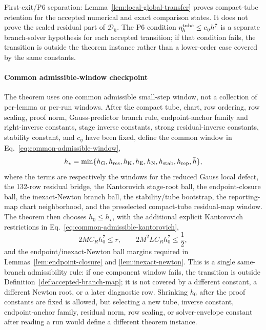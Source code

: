\documentclass[preprint,12pt]{elsarticle}
\begin{document}
First-exit/P6 separation: Lemma~\ref{lem:local-global-transfer} proves
compact-tube retention for the accepted numerical and exact comparison states.
It does not prove the scaled residual part of \(\mathcal D_h\).  The P6
condition \(\eta_h^{\rm tube}\le c_\eta h^7\) is a separate branch-solver
hypothesis for each accepted transition; if that condition fails, the
transition is outside the theorem instance rather than a lower-order case
covered by the same constants.

\paragraph{Common admissible-window checkpoint}
The theorem uses one common admissible small-step window, not a collection of
per-lemma or per-run windows.  After the compact tube, chart, row ordering,
row scaling, proof norm, Gauss-predictor branch rule, endpoint-anchor family and
right-inverse constants, stage inverse constants, strong residual-inverse
constants, stability constant, and \(c_\eta\) have been fixed, define the
common window in Eq.~\eqref{eq:common-admissible-window},
\begin{equation}
\label{eq:common-admissible-window}
  h_\star=
  \min\{h_{\rm G},h_{\rm res},h_{\rm K},h_{\rm E},h_{\rm N},
  h_{\rm stab},h_{\rm rep},\bar h\},
\end{equation}
where the terms are respectively the windows for the reduced Gauss local
defect, the 132-row residual bridge, the Kantorovich stage-root ball, the
endpoint-closure ball, the inexact-Newton branch ball, the stability/tube
bootstrap, the reporting-map chart neighborhood, and the preselected
compact-tube residual-map window.  The theorem then chooses
\(h_0\le h_\star\), with the additional explicit Kantorovich restrictions
in Eq.~\eqref{eq:common-admissible-kantorovich},
\begin{equation}
\label{eq:common-admissible-kantorovich}
  2MC_Rh_0^7\le r,\qquad
  2M^2LC_Rh_0^7\le \frac12 ,
\end{equation}
and the endpoint/inexact-Newton ball margins required in
Lemmas~\ref{lem:endpoint-closure} and \ref{lem:inexact-newton}.  This is a
single same-branch admissibility rule: if one component window fails, the
transition is outside Definition~\ref{def:accepted-branch-map}; it is not
covered by a different constant, a different Newton root, or a later
diagnostic row.  Shrinking \(h_0\) after the proof constants are fixed is
allowed, but selecting a new tube, inverse constant, endpoint-anchor family,
residual norm, row scaling, or solver-envelope constant after reading a run
would define a different theorem instance.
\end{document}
